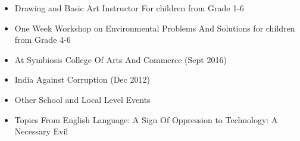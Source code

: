 \documentclass[10pt,a4paper]{altacv}
\begin{document}
\tagline{ }


\begin{fullwidth}
\makecvheader
\end{fullwidth}




\begin{itemize}
\item Drawing and Basic Art Instructor For children from Grade 1-6
\item One Week Workshop on Environmental Problems And Solutions for children from Grade 4-6
\end{itemize}

\divider
\medskip



\divider

\begin{itemize}
    \item At Symbiosis College Of Arts And Commerce (Sept 2016)
    \item India Against Corruption (Dec 2012)
    \item Other School and Local Level Events
    \item Topics From English Language: A Sign Of Oppression to Technology: A Necessary Evil
\end{itemize}
\end{document}
